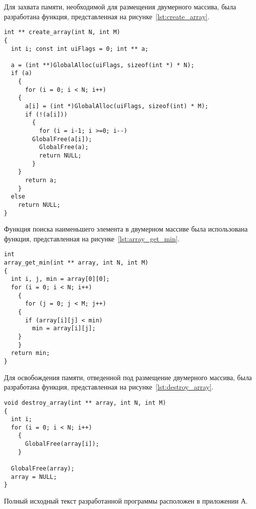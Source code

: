 Для захвата памяти, необходимой для размещения двумерного массива,
была разработана функция, представленная на рисунке~\ref{lst:create_array}.

\begin{lstlisting}[caption=Функция создания двумерного динамического массива,label=lst:create_array]
int ** create_array(int N, int M)
{
  int i; const int uiFlags = 0; int ** a;

  a = (int **)GlobalAlloc(uiFlags, sizeof(int *) * N);
  if (a)
    {
      for (i = 0; i < N; i++)
	{
	  a[i] = (int *)GlobalAlloc(uiFlags, sizeof(int) * M);
	  if (!(a[i]))
	    {
	      for (i = i-1; i >=0; i--)
		GlobalFree(a[i]);	    
	      GlobalFree(a);
	      return NULL;
	    }
	}
      return a;
    }
  else
    return NULL;
}
\end{lstlisting}

Функция поиска наименьшего элемента в двумерном массиве была использована 
функция, представленная на рисунке~\ref{lst:array_get_min}.

\begin{lstlisting}[caption=Функция поиска минимального элемента в массиве,label=lst:array_get_min]
int
array_get_min(int ** array, int N, int M)
{
  int i, j, min = array[0][0];
  for (i = 0; i < N; i++)
    {
      for (j = 0; j < M; j++)
	{
	  if (array[i][j] < min)
	    min = array[i][j];
	}
    }
  return min;
}
\end{lstlisting}

Для освобождения памяти, отведенной под размещение двумерного массива,
была разработана функция, представленная на рисунке~\ref{lst:destroy_array}.

\begin{lstlisting}[caption=Функция освобождения памяти,label=lst:destroy_array]
void destroy_array(int ** array, int N, int M)
{
  int i;
  for (i = 0; i < N; i++)
    {
      GlobalFree(array[i]);
    }

  GlobalFree(array);
  array = NULL;
}
\end{lstlisting}

Полный исходный текст разработанной программы расположен в приложении А.

\newpage
